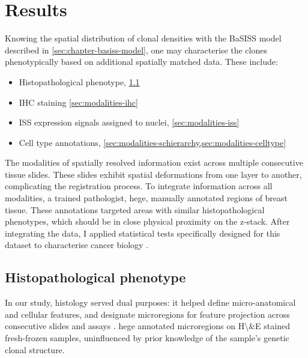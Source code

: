 \section{Results}

\label{sec:modalities-multimodal-results}

Knowing the spatial distribution of clonal densities with the \ac{BaSISS} model described in \cref{sec:chapter-basiss-model}, one may characterise the clones phenotypically based on additional spatially matched data. These include:

\begin{itemize}
    \item Histopathological phenotype, \cref{sec:modalities-histopath}
    \item \ac{IHC} staining \cref{sec:modalities-ihc}
    \item \ac{ISS} expression signals assigned to nuclei, \cref{sec:modalities-iss}
    \item Cell type annotations, \cref{sec:modalities-schierarchy,sec:modalities-celltype}
\end{itemize}


The modalities of spatially resolved information exist across multiple consecutive tissue slides. These slides exhibit spatial deformations from one layer to another, complicating the registration process. To integrate information across all modalities, a trained pathologist, \acf{hege}, manually annotated regions of breast tissue. These annotations targeted areas with similar histopathological phenotypes, which should be in close physical proximity on the z-stack. After integrating the data, I applied statistical tests specifically designed for this dataset to characterise cancer biology .

\subsection{Histopathological phenotype}
\label{sec:modalities-histopath}

In our study, histology served dual purposes: it helped define micro-anatomical and cellular features, and designate microregions for feature projection across consecutive slides and assays . \acl{hege} annotated microregions on \acf{H\&E} stained fresh-frozen samples, uninfluenced by prior knowledge of the sample's genetic clonal structure.

